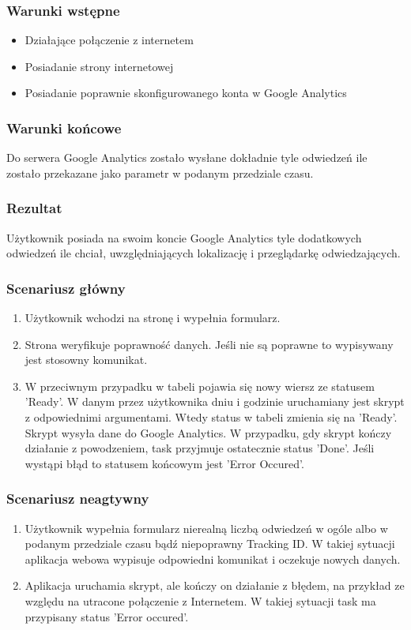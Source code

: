 \documentclass{article}
\begin{document}
\subsubsection{Warunki wstępne}
\begin{itemize}
\item Działające połączenie z internetem
\item Posiadanie strony internetowej
\item Posiadanie poprawnie skonfigurowanego konta w Google Analytics
\end{itemize}

\subsubsection{Warunki końcowe}
Do serwera Google Analytics zostało wysłane dokładnie tyle odwiedzeń ile zostało przekazane jako parametr w podanym przedziale czasu.

\subsubsection{Rezultat}
Użytkownik posiada na swoim koncie Google Analytics tyle dodatkowych odwiedzeń ile chciał, uwzględniających lokalizację i przeglądarkę odwiedzających.

\subsubsection{Scenariusz główny}
\begin{enumerate}
\item Użytkownik wchodzi na stronę i wypełnia formularz.
\item Strona weryfikuje poprawność danych. Jeśli nie są poprawne to wypisywany jest stosowny komunikat.
\item W przeciwnym przypadku w tabeli pojawia się nowy wiersz ze statusem 'Ready'. W danym przez użytkownika dniu i godzinie uruchamiany jest skrypt z odpowiednimi argumentami. Wtedy status  w tabeli zmienia się na 'Ready'. Skrypt wysyła dane do Google Analytics. W przypadku, gdy skrypt kończy działanie z powodzeniem, task przyjmuje ostatecznie status 'Done'. Jeśli wystąpi błąd to statusem końcowym jest 'Error Occured'.
\end{enumerate}

\subsubsection{Scenariusz neagtywny}
\begin{enumerate}

\item Użytkownik wypełnia formularz nierealną liczbą odwiedzeń w ogóle albo w podanym przedziale czasu bądź niepoprawny Tracking ID\@. W takiej sytuacji aplikacja webowa wypisuje odpowiedni komunikat i oczekuje nowych danych.

\item Aplikacja uruchamia skrypt, ale kończy on działanie z błędem, na przykład ze względu na utracone połączenie z Internetem. W takiej sytuacji task ma przypisany status 'Error occured'.


\end{enumerate}
\end{document}
